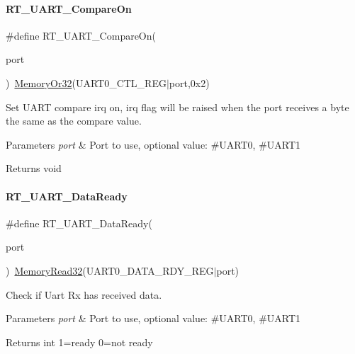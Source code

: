 \paragraph{\texorpdfstring{R\+T\+\_\+\+U\+A\+R\+T\+\_\+\+Compare\+On}{RT\_UART\_CompareOn}}
{\footnotesize\ttfamily \#define R\+T\+\_\+\+U\+A\+R\+T\+\_\+\+Compare\+On(\begin{DoxyParamCaption}\item[{}]{port }\end{DoxyParamCaption})~\mbox{\hyperlink{a00020_a9ea92ebccdef6bdaca4d00210cc7266d}{Memory\+Or32}}(U\+A\+R\+T0\+\_\+\+C\+T\+L\+\_\+\+R\+EG$\vert$port,0x2)}



Set U\+A\+RT compare irq on, irq flag will be raised when the port receives a byte the same as the compare value. 


\begin{DoxyParams}{Parameters}
{\em port} & Port to use, optional value\+: \#\+U\+A\+R\+T0, \#\+U\+A\+R\+T1 \\
\hline
\end{DoxyParams}
\begin{DoxyReturn}{Returns}
void 
\end{DoxyReturn}
\mbox{\label{a00056_abd2a573ae35e4f6381f9f9758a12806b}} 
\paragraph{\texorpdfstring{R\+T\+\_\+\+U\+A\+R\+T\+\_\+\+Data\+Ready}{RT\_UART\_DataReady}}
{\footnotesize\ttfamily \#define R\+T\+\_\+\+U\+A\+R\+T\+\_\+\+Data\+Ready(\begin{DoxyParamCaption}\item[{}]{port }\end{DoxyParamCaption})~\mbox{\hyperlink{a00020_a706b02571285f92589fbb0b964d7d0bb}{Memory\+Read32}}(U\+A\+R\+T0\+\_\+\+D\+A\+T\+A\+\_\+\+R\+D\+Y\+\_\+\+R\+EG$\vert$port)}



Check if Uart Rx has received data. 


\begin{DoxyParams}{Parameters}
{\em port} & Port to use, optional value\+: \#\+U\+A\+R\+T0, \#\+U\+A\+R\+T1 \\
\hline
\end{DoxyParams}
\begin{DoxyReturn}{Returns}
int 1=ready 0=not ready 
\end{DoxyReturn}
\mbox{\label{a00056_a74f1bca1f0b60eeec1f84bcba3e34919}} 
